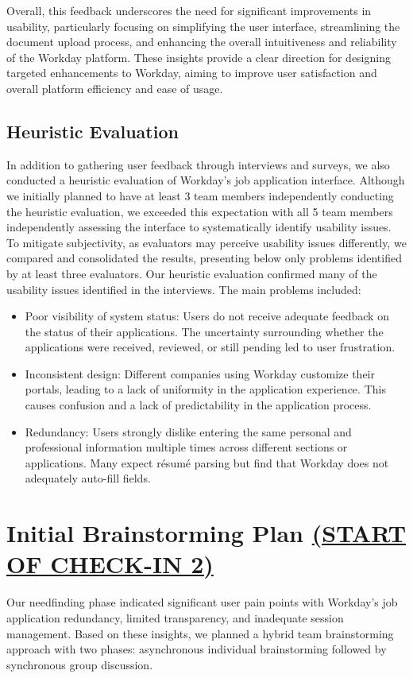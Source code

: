 \documentclass[
	letterpaper, %
]{jdf}
\begin{document}
\begin{sloppypar}
Overall, this feedback underscores the need for significant improvements in usability, particularly focusing on simplifying the user interface, streamlining the document upload process, and enhancing the overall intuitiveness and reliability of the Workday platform. These insights provide a clear direction for designing targeted enhancements to Workday, aiming to improve user satisfaction and overall platform efficiency and ease of usage.
\hfill \break

\subsection{Heuristic Evaluation}
In addition to gathering user feedback through interviews and surveys, we also conducted a heuristic evaluation of Workday’s job application interface. Although we initially planned to have at least 3 team members independently conducting the heuristic evaluation, we exceeded this expectation with all 5 team members independently assessing the interface to systematically identify usability issues. To mitigate subjectivity, as evaluators may perceive usability issues differently, we compared and consolidated the results, presenting below only problems identified by at least three evaluators.  Our heuristic evaluation confirmed many of the usability issues identified in the interviews. The main problems included:
\begin{itemize}
\item Poor visibility of system status: Users do not receive adequate feedback on the status of their applications. The uncertainty surrounding whether the applications were received, reviewed, or still pending led to user frustration.
\item Inconsistent design: Different companies using Workday customize their portals, leading to a lack of uniformity in the application experience. This causes confusion and a lack of predictability in the application process.
\item Redundancy: Users strongly dislike entering the same personal and professional information multiple times across different sections or applications. Many expect résumé parsing but find that Workday does not adequately auto-fill fields.
\end{itemize}

\section{Initial Brainstorming Plan \underline{(START OF CHECK-IN 2)}}
Our needfinding phase indicated significant user pain points with Workday's job application redundancy, limited transparency, and inadequate session management. Based on these insights, we planned a hybrid team brainstorming approach with two phases: asynchronous individual brainstorming followed by synchronous group discussion.


\end{sloppypar}
\end{document}
